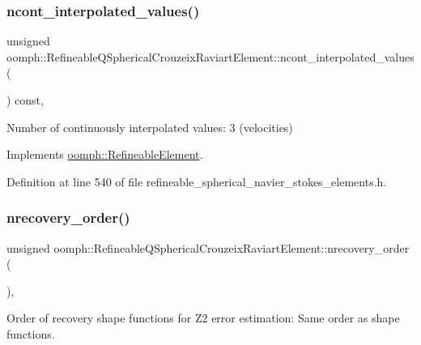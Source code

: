 \subsubsection{\texorpdfstring{ncont\+\_\+interpolated\+\_\+values()}{ncont\_interpolated\_values()}}
{\footnotesize\ttfamily unsigned oomph\+::\+Refineable\+Q\+Spherical\+Crouzeix\+Raviart\+Element\+::ncont\+\_\+interpolated\+\_\+values (\begin{DoxyParamCaption}{ }\end{DoxyParamCaption}) const\hspace{0.3cm}{\ttfamily [inline]}, {\ttfamily [virtual]}}



Number of continuously interpolated values\+: 3 (velocities) 



Implements \hyperlink{classoomph_1_1RefineableElement_a53e171a18c9f43f1db90a6876516a073}{oomph\+::\+Refineable\+Element}.



Definition at line 540 of file refineable\+\_\+spherical\+\_\+navier\+\_\+stokes\+\_\+elements.\+h.

\mbox{\label{classoomph_1_1RefineableQSphericalCrouzeixRaviartElement_a1e1489874c8a952f2556c14fdea41010}} 
\subsubsection{\texorpdfstring{nrecovery\+\_\+order()}{nrecovery\_order()}}
{\footnotesize\ttfamily unsigned oomph\+::\+Refineable\+Q\+Spherical\+Crouzeix\+Raviart\+Element\+::nrecovery\+\_\+order (\begin{DoxyParamCaption}{ }\end{DoxyParamCaption})\hspace{0.3cm}{\ttfamily [inline]}, {\ttfamily [virtual]}}



Order of recovery shape functions for Z2 error estimation\+: Same order as shape functions. 



